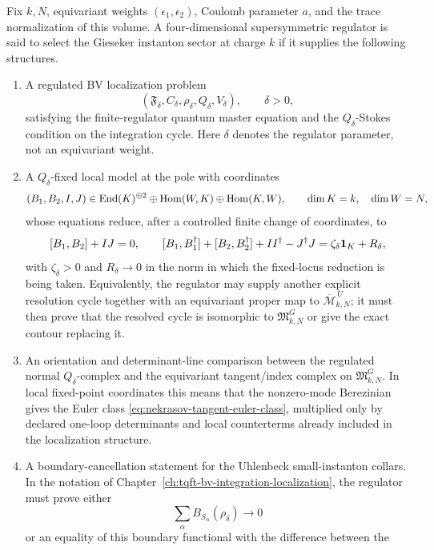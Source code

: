 \begin{definition}
\label{def:gieseker-regulator-selection-datum}
Fix \(k,N\), equivariant weights
\((\epsilon_1,\epsilon_2)\), Coulomb parameter \(a\), and the trace
normalization of this volume.  A four-dimensional supersymmetric regulator is
said to select the Gieseker instanton sector at charge \(k\) if it supplies
the following structures.
\begin{enumerate}
  \item A regulated BV localization problem
  \[
    (\mathfrak F_\delta,C_\delta,\rho_\delta,Q_\delta,V_\delta),
    \qquad \delta>0,
  \]
  satisfying the finite-regulator quantum master equation and the
  \(Q_\delta\)-Stokes condition on the integration cycle.  Here \(\delta\)
  denotes the regulator parameter, not an equivariant weight.
  \item A \(Q_\delta\)-fixed local model at the pole with coordinates
  \[
    (B_1,B_2,I,J)\in
    {\rm End}(K)^{\oplus2}\oplus{\rm Hom}(W,K)\oplus{\rm Hom}(K,W),
    \qquad \dim K=k,\quad \dim W=N,
  \]
  whose equations reduce, after a controlled finite change of coordinates,
  to
  \[
    [B_1,B_2]+IJ=0,\qquad
    [B_1,B_1^\dagger]+[B_2,B_2^\dagger]
    +II^\dagger-J^\dagger J=\zeta_\delta{\bf 1}_K+R_\delta ,
  \]
  with \(\zeta_\delta>0\) and \(R_\delta\to0\) in the norm in which the
  fixed-locus reduction is being taken.  Equivalently, the regulator may supply
  another explicit resolution cycle together with an equivariant proper map
  to \(\overline{\mathcal M}_{k,N}^{\,U}\); it must then prove that the
  resolved cycle is isomorphic to \(\mathfrak M_{k,N}^{G}\) or give the
  exact contour replacing it.
  \item An orientation and determinant-line comparison between the regulated
  normal \(Q_\delta\)-complex and the equivariant tangent/index complex on
  \(\mathfrak M_{k,N}^{G}\).  In local fixed-point coordinates this means
  that the nonzero-mode Berezinian gives the Euler class
  \eqref{eq:nekrasov-tangent-euler-class}, multiplied only by declared
  one-loop determinants and local counterterms already included in the
  localization structure.
  \item A boundary-cancellation statement for the Uhlenbeck
  small-instanton collars.  In the notation of
  Chapter~\ref{ch:tqft-bv-integration-localization}, the regulator must
  prove either
  \[
    \sum_\alpha B_{S_\alpha}(\rho_\delta)\longrightarrow0
  \]
  or an equality of this boundary functional with the difference between the

\end{enumerate}
\end{definition}
